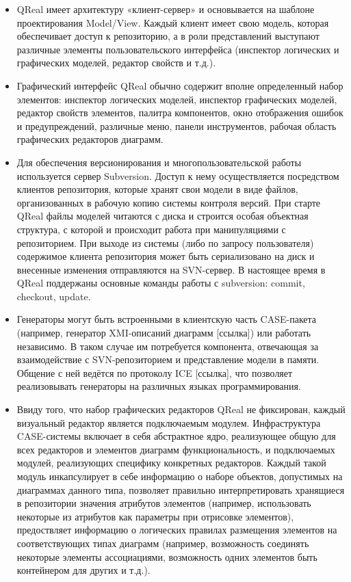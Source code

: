 \documentclass[a4paper]{article}
\begin{document}
\begin{itemize}
  \item QReal имеет архитектуру «клиент-сервер» и основывается на шаблоне проектирования Model/View. Каждый клиент имеет свою модель, которая обеспечивает доступ к репозиторию, а в роли представлений выступают различные элементы пользовательского интерфейса (инспектор логических и графических моделей, редактор свойств и т.д.).
  \item Графический интерфейс QReal обычно содержит вполне определенный набор элементов: инспектор логических моделей, инспектор графических моделей, редактор свойств элементов, палитра компонентов, окно отображения ошибок и предупреждений, различные меню, панели инструментов, рабочая область графических редакторов диаграмм.
  \item Для обеспечения версионирования и многопользовательской работы используется сервер Subversion. Доступ к нему осуществляется посредством клиентов репозитория, которые хранят свои модели в виде файлов, организованных в рабочую копию системы контроля версий. При старте QReal файлы моделей читаются с диска и строится особая объектная структура, с которой и происходит работа при манипуляциями с репозиторием. При выходе из системы (либо по запросу пользователя) содержимое клиента репозитория может быть сериализовано на диск и внесенные изменения отправляются на SVN-сервер. В настоящее время в QReal поддержаны основные команды работы с subversion: commit, checkout, update. 
  \item Генераторы могут быть встроенными в клиентскую часть CASE-пакета (например, генератор XMI-описаний диаграмм [ссылка]) или работать независимо. В таком случае им потребуется компонента, отвечающая за взаимодействие с SVN-репозиторием и представление модели в памяти. Общение с ней ведётся по протоколу ICE [ссылка], что позволяет реализовывать генераторы на различных языках программирования.
  \item Ввиду того, что набор графических редакторов QReal не фиксирован, каждый визуальный редактор является подключаемым модулем. Инфраструктура CASE-системы включает в себя абстрактное ядро, реализующее общую для всех редакторов и элементов диаграмм функциональность, и подключаемых модулей, реализующих специфику конкретных редакторов. Каждый такой модуль инкапсулирует в себе информацию о наборе объектов, допустимых на диаграммах данного типа, позволяет правильно интерпретировать хранящиеся в репозитории значения атрибутов элементов (например, использовать некоторые из атрибутов как параметры при отрисовке элементов), предоствляет информацию о логических правилах размещения элементов на соответствующих типах диаграмм (например, возможность соединять некоторые элементы ассоциациями, возможность одних элементов быть контейнером для других и т.д.).

\end{itemize}
\end{document}
